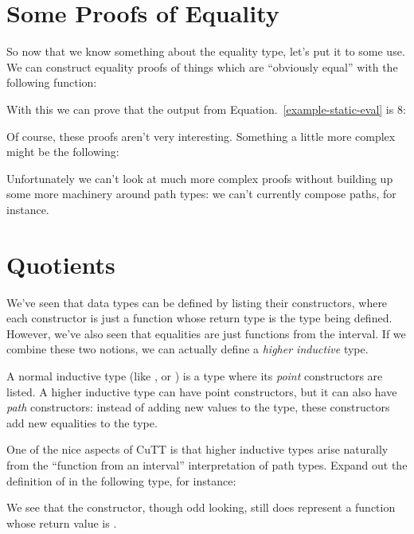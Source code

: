 \section{Some Proofs of Equality}
So now that we know something about the equality type, let's put it to some use.
We can construct equality proofs of things which are ``obviously equal'' with
the following function:
\begin{agdalisting}
\end{agdalisting}
With this we can prove that the output from Equation.~\ref{example-static-eval}
is 8:
\begin{agdalisting*}
\end{agdalisting*}

Of course, these proofs aren't very interesting.
Something a little more complex might be the following:
\begin{agdalisting}
\end{agdalisting}
Unfortunately we can't look at much more complex proofs without building up some
more machinery around path types: we can't currently compose paths, for
instance.
\section{Quotients}
We've seen that data types can be defined by listing their constructors, where
each constructor is just a function whose return type is the type being defined.
However, we've also seen that equalities are just functions from the interval.
If we combine these two notions, we can actually define a \emph{higher
  inductive} type.
\begin{definition}
  A normal inductive type (like , or ) is a type
  where its \emph{point} constructors are listed.
  A higher inductive type can have point constructors, but it can also have
  \emph{path} constructors: instead of adding new values to the type, these
  constructors add new equalities to the type.
\end{definition}

One of the nice aspects of CuTT is that higher inductive types arise naturally
from the ``function from an interval'' interpretation of path types.
Expand out the definition of \AgdaFunction{\(\equiv\)} in the following type,
for instance:
\begin{agdalisting}
\end{agdalisting}
We see that the  constructor, though odd looking,
still does represent a function whose return value is
.

